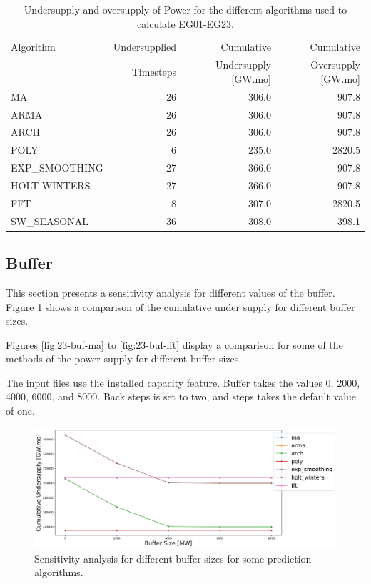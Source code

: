 \documentclass[11pt]{article}
\begin{document}
\begin{table}[H]
	\centering
	\caption{Undersupply and oversupply of Power for the different algorithms used to calculate EG01-EG23.}
	\label{tab:23-power}
	\begin{tabularx}{\textwidth}{lRRR}
		\hline
		Algorithm & Undersupplied & Cumulative  & Cumulative \\
		& Timesteps     & Undersupply [GW.mo]  & Oversupply [GW.mo] \\ \hline
		MA        & 26 	& 306.0 &  907.8   \\ 
		ARMA      & 26 	& 306.0 &  907.8   \\ 
		ARCH      & 26 	& 306.0 &  907.8   \\ 
		POLY      &  6 	& 235.0 &  2820.5  \\ 
		EXP\_SMOOTHING 	& 27 & 366.0 & 907.8 \\ 
		HOLT-WINTERS  	& 27 & 366.0 & 907.8 \\ 
		FFT       & 8	& 307.0	& 2820.5 \\ 
		SW\_SEASONAL    & 36 & 308.0 & 398.1	\\ \hline
	\end{tabularx}
\end{table}

\subsection{Buffer}

This section presents a sensitivity analysis for different values of the buffer. Figure \ref{fig:23-buff} shows a comparison of the cumulative under supply for different buffer sizes.

Figures \ref{fig:23-buf-ma} to \ref{fig:23-buf-fft} display a comparison for some of the methods of the power supply for different buffer sizes.

The input files use the installed capacity feature. Buffer takes the values 0, 2000, 4000, 6000, and 8000. Back steps is set to two, and steps takes the default value of one.

\begin{figure}[H]
	\centering
	\includegraphics[width=\textwidth]{23-figures/23-sens-buffer.png} 
	\hfill
	\caption{Sensitivity analysis for different buffer sizes for some prediction algorithms.}
	\label{fig:23-buff}
\end{figure}
\end{document}
